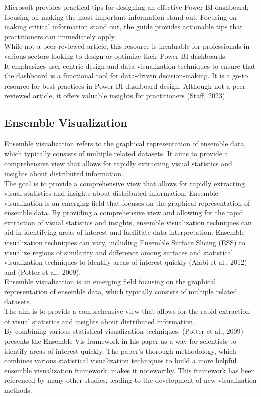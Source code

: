 \documentclass[print]{nuthesis}
\begin{document}
Microsoft provides practical tips for designing an effective Power BI dashboard, focusing on making the most important information stand out.
Focusing on making critical information stand out, the guide provides actionable tips that practitioners can immediately apply.\\
While not a peer-reviewed article, this resource is invaluable for professionals in various sectors looking to design or optimize their Power BI dashboards.\\
It emphasizes user-centric design and data visualization techniques to ensure that the dashboard is a functional tool for data-driven decision-making.
It is a go-to resource for best practices in Power BI dashboard design.
Although not a peer-reviewed article, it offers valuable insights for practitioners (Staff, 2023).

\hypertarget{ensemble-visualization}{%
\subsection{Ensemble Visualization}\label{ensemble-visualization}}

Ensemble visualization refers to the graphical representation of ensemble data, which typically consists of multiple related datasets.
It aims to provide a comprehensive view that allows for rapidly extracting visual statistics and insights about distributed information.\\
The goal is to provide a comprehensive view that allows for rapidly extracting visual statistics and insights about distributed information.
Ensemble visualization is an emerging field that focuses on the graphical representation of ensemble data.
By providing a comprehensive view and allowing for the rapid extraction of visual statistics and insights, ensemble visualization techniques can aid in identifying areas of interest and facilitate data interpretation.
Ensemble visualization techniques can vary, including Ensemble Surface Slicing (ESS) to visualize regions of similarity and difference among surfaces and statistical visualization techniques to identify areas of interest quickly (Alabi et al., 2012) and (Potter et al., 2009).\\
Ensemble visualization is an emerging field focusing on the graphical representation of ensemble data, which typically consists of multiple related datasets.\\
The aim is to provide a comprehensive view that allows for the rapid extraction of visual statistics and insights about distributed information.\\
By combining various statistical visualization techniques, (Potter et al., 2009) presents the Ensemble-Vis framework in his paper as a way for scientists to identify areas of interest quickly.
The paper's thorough methodology, which combines various statistical visualization techniques to build a more helpful ensemble visualization framework, makes it noteworthy.
This framework has been referenced by many other studies, leading to the development of new visualization methods.
\end{document}
